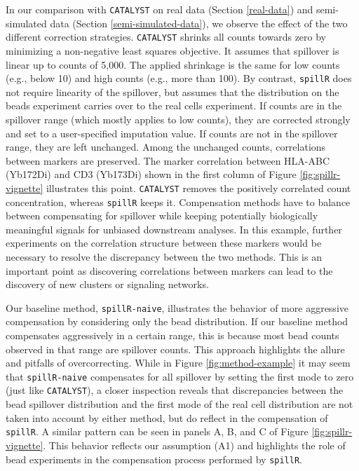\documentclass{bioinfo}
\begin{document}
In our comparison with \texttt{CATALYST} on real data (Section
\ref{real-data}) and semi-simulated data (Section
\ref{semi-simulated-data}), we observe the effect of the two different
correction strategies. \texttt{CATALYST} shrinks all counts towards zero
by minimizing a non-negative least squares objective. It assumes that
spillover is linear up to counts of 5,000. The applied shrinkage is the
same for low counts (e.g., below 10) and high counts (e.g., more than
100). By contrast, \texttt{spillR} does not require linearity of the
spillover, but assumes that the distribution on the beads experiment
carries over to the real cells experiment. If counts are in the
spillover range (which mostly applies to low counts), they are corrected
strongly and set to a user-specified imputation value. If counts are not
in the spillover range, they are left unchanged. Among the unchanged
counts, correlations between markers are preserved. The marker
correlation between HLA-ABC (Yb172Di) and CD3 (Yb173Di) shown in the
first column of Figure \ref{fig:spillr-vignette} illustrates this point.
\texttt{CATALYST} removes the positively correlated count concentration,
whereas \texttt{spillR} keeps it. Compensation methods have to balance
between compensating for spillover while keeping potentially
biologically meaningful signals for unbiased downstream analyses. In
this example, further experiments on the correlation structure between
these markers would be necessary to resolve the discrepancy between the
two methods. This is an important point as discovering correlations
between markers can lead to the discovery of new clusters or signaling
networks.

Our baseline method, \texttt{spillR-naive}, illustrates the behavior of
more aggressive compensation by considering only the bead distribution.
If our baseline method compensates aggressively in a certain range, this
is because most bead counts observed in that range are spillover counts.
This approach highlights the allure and pitfalls of overcorrecting.
While in Figure \ref{fig:method-example} it may seem that
\texttt{spillR-naive} compensates for all spillover by setting the first
mode to zero (just like \texttt{CATALYST}), a closer inspection reveals
that discrepancies between the bead spillover distribution and the first
mode of the real cell distribution are not taken into account by either
method, but do reflect in the compensation of \texttt{spillR}. A similar
pattern can be seen in panels A, B, and C of Figure
\ref{fig:spillr-vignette}. This behavior reflects our assumption (A1)
and highlights the role of bead experiments in the compensation process
performed by \texttt{spillR}.
\end{document}
